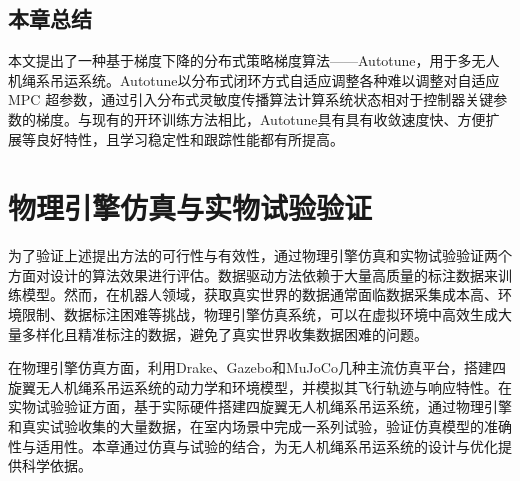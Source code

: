 \documentclass[lang=chs, degree=master, blindreview=true, winfonts=true]{yanputhesis}
\begin{document}



\section{本章总结}
本文提出了一种基于梯度下降的分布式策略梯度算法——Autotune，用于多无人机绳系吊运系统。Autotune以分布式闭环方式自适应调整各种难以调整对自适应 MPC 超参数，通过引入分布式灵敏度传播算法计算系统状态相对于控制器关键参数的梯度。与现有的开环训练方法相比，Autotune具有具有收敛速度快、方便扩展等良好特性，且学习稳定性和跟踪性能都有所提高。


\cleardoublepage

\chapter{物理引擎仿真与实物试验验证}
为了验证上述提出方法的可行性与有效性，通过物理引擎仿真和实物试验验证两个方面对设计的算法效果进行评估。数据驱动方法依赖于大量高质量的标注数据来训练模型。然而，在机器人领域，获取真实世界的数据通常面临数据采集成本高、环境限制、数据标注困难等挑战，物理引擎仿真系统，可以在虚拟环境中高效生成大量多样化且精准标注的数据，避免了真实世界收集数据困难的问题。

在物理引擎仿真方面，利用Drake、Gazebo和MuJoCo几种主流仿真平台，搭建四旋翼无人机绳系吊运系统的动力学和环境模型，并模拟其飞行轨迹与响应特性。在实物试验验证方面，基于实际硬件搭建四旋翼无人机绳系吊运系统，通过物理引擎和真实试验收集的大量数据，在室内场景中完成一系列试验，验证仿真模型的准确性与适用性。本章通过仿真与试验的结合，为无人机绳系吊运系统的设计与优化提供科学依据。
\end{document}
